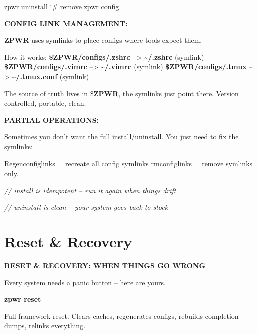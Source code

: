 \documentclass[11pt,a4paper,twoside]{book}
\begin{document}
\begin{codebox}
\color{neongreen}zpwr uninstall              {\char`\#} remove zpwr config\\
\end{codebox}


\vspace{12pt}
{\bfseries\color{neonyellow} CONFIG LINK MANAGEMENT:}\vspace{4pt}

\textbf{ZPWR} uses symlinks to place configs where tools expect them.

How it works: \textbf{\$ZPWR/configs/.zshrc}  -->  \textbf{\textasciitilde{}/.zshrc}     (symlink) \textbf{\$ZPWR/configs/.vimrc}  -->  \textbf{\textasciitilde{}/.vimrc}     (symlink) \textbf{\$ZPWR/configs/.tmux}   -->  \textbf{\textasciitilde{}/.tmux.conf} (symlink)

The source of truth lives in \$\textbf{ZPWR}, the symlinks just point there. Version controlled, portable, clean.


\vspace{12pt}
{\bfseries\color{neonyellow} PARTIAL OPERATIONS:}\vspace{4pt}

Sometimes you don't want the full install/uninstall. You just need to fix the symlinks:

Regenconfiglinks = recreate all config symlinks rmconfiglinks    = remove symlinks only.

{\small\itshape\color{dimtext} // install is idempotent -- run it again when things drift}

{\small\itshape\color{dimtext} // uninstall is clean -- your system goes back to stock}


\vspace{16pt}

\section{Reset \& Recovery}


\vspace{10pt}
{\large\bfseries\color{neoncyan} RESET \& RECOVERY: WHEN THINGS GO WRONG}\vspace{6pt}

Every system needs a panic button -- here are yours.


\vspace{12pt}
{\bfseries\color{neonyellow} zpwr reset}\vspace{4pt}

Full framework reset. Clears caches, regenerates configs, rebuilds completion dumps, relinks everything.
\end{document}
